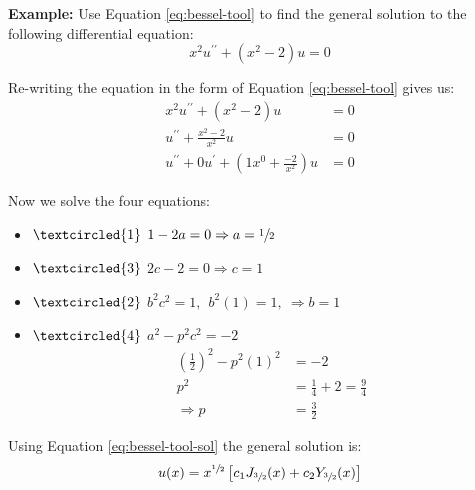 
\noindent\textbf{Example:}  Use Equation \ref{eq:bessel-tool} to find the general solution to the following differential equation:
\begin{equation*}
x^2 u^{\prime \prime} + \left(x^2 - 2\right)u = 0
\end{equation*}

Re-writing the equation in the form of Equation \ref{eq:bessel-tool} gives us:
\begin{align*}
x^2 u^{\prime \prime} + \left(x^2 - 2\right)u &= 0 \\
u^{\prime \prime} + \frac{x^2-2}{x^2}u &= 0 \\
u^{\prime \prime} + 0u^{\prime} + \left(1x^0 + \frac{-2}{x^2} \right)u &= 0
\end{align*}

Now we solve the four equations:
\begin{itemize}
\item $\textcircled{1}$  $1-2a = 0 \Rightarrow a = \sfrac{1}{2}$
\item $\textcircled{3}$ $2c-2=0 \Rightarrow c = 1$
\item $\textcircled{2}$ $b^2c^2=1, \ \ b^2(1) = 1, \ \Rightarrow b=1$
\item $\textcircled{4}$ $a^2 - p^2c^2=-2$ 
\begin{align*}
\left(\frac{1}{2} \right)^2 - p^2(1)^2 &=-2 \\
p^2 &= \frac{1}{4} + 2 = \frac{9}{4} \\
\Rightarrow p &= \frac{3}{2}
\end{align*}
\end{itemize}
Using Equation \ref{eq:bessel-tool-sol} the general solution is:
\begin{equation*}
u(x) = x^{\sfrac{1}{2}}\left[c_1 J_{\sfrac{3}{2}}(x) + c_2 Y_{\sfrac{3}{2}}(x) \right]
\end{equation*}


